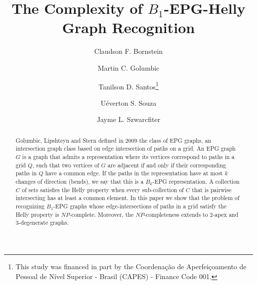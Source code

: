 \documentclass[runningheads]{llncs}
\begin{document}
%
\title{The Complexity of $B_{1}$-EPG-Helly Graph Recognition}
%
%
\author{Claudson F.  Bornstein \and
Martin C. Golumbic  \and
Tanilson D. Santos\thanks{This study was financed in part by the Coordena{\c c}\~ao de Aperfei{\c c}oamento de Pessoal de N\'ivel Superior - Brasil (CAPES) - Finance Code 001.} \and 
U\'everton S. Souza \and
Jayme L.  Szwarcfiter
}
%
%

%
\maketitle              %
%
\begin{abstract}

Golumbic, Lipshteyn and Stern defined in 2009 the class of EPG graphs, an intersection graph class  based on edge intersection of paths on a grid. An EPG graph $G$ is a graph that admits a representation where its vertices correspond to paths in a grid $Q$, such that two vertices of $G$ are adjacent if and only if their corresponding paths in $Q$ have a common edge. If the paths in the representation have at most $k$ changes of direction  (bends), we say that this is a  $B_k$-EPG representation. A collection $C$ of sets satisfies the Helly property when every sub-collection of $C$ that is pairwise intersecting has at least a common element. In this paper we show that the problem of recognizing $B_1$-EPG graphs whose edge-intersections of paths in a grid satisfy the Helly property is $NP$-complete. Moreover, the $NP$-completeness extends to 2-apex and 3-degenerate graphs.

\end{abstract}
%
%
%
\end{document}
